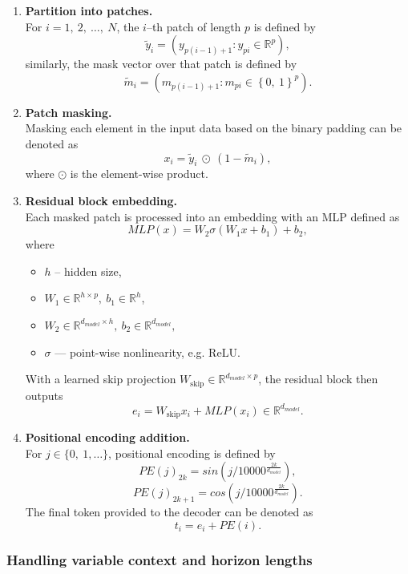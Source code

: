 \begin{enumerate}
    \item \textbf{Partition into patches.}\\
        For $ i = 1,\ 2,\ \ldots, \ N $, the $ i $--th patch of length $ p $ is defined by
        \[ \tilde{y}_i = \left( y_{p(i-1)+1}:y_{pi} \in \mathbb{R}^p \right),\]
        similarly, the mask vector over that patch is defined by
        \[ \tilde{m}_i=\left( m_{p(i-1)+1}:m_{pi} \in \left\{ 0,\ 1 \right\}^p \right).\]
    \item \textbf{Patch masking.}\\
        Masking each element in the input data based on the binary padding can be denoted as
        \[ x_i = \tilde{y}_i\ \odot\ (1-\tilde{m}_i),\]
        where $\odot$ is the element-wise product.
    \item \textbf{Residual block embedding.}\\
        Each masked patch is processed into an embedding with an MLP defined as
        \[MLP(x) = W_2 \sigma(W_1x+b_1) + b_2,\]
        where
        \begin{itemize}
            \item $ h $ -- hidden size,
            \item $ W_1 \in \mathbb{R}^{h\times p},\ b_1\in \mathbb{R}^h $,
            \item $ W_2 \in \mathbb{R}^{d_{model}\times h},\ b_2 \in \mathbb{R}^{d_{model}}, $
            \item $ \sigma $ --- point-wise nonlinearity, e.g. ReLU. %
        \end{itemize}
        With a learned skip projection $W_{\mathrm{skip}}\in\mathbb{R}^{d_{model}\times p}$, the residual block then outputs
        \[e_i = W_{\mathrm{skip}}x_i + MLP(x_i) \in \mathbb{R}^{d_{model}}.\]
    \item \textbf{Positional encoding addition.}\\
        For $ j \in \{0,\ 1, \ldots\} $, positional encoding is defined by
        \[PE(j)_{2k}=sin\left(j / 10000^{\frac{2k}{d_{model}}}\right),\]
        \[PE(j)_{2k+1}=cos\left(j / 10000^{\frac{2k}{d_{model}}}\right).\]
        The final token provided to the decoder can be denoted as
        \[t_i = e_i+PE(i).\]
\end{enumerate}

\subsubsection{Handling variable context and horizon lengths}


